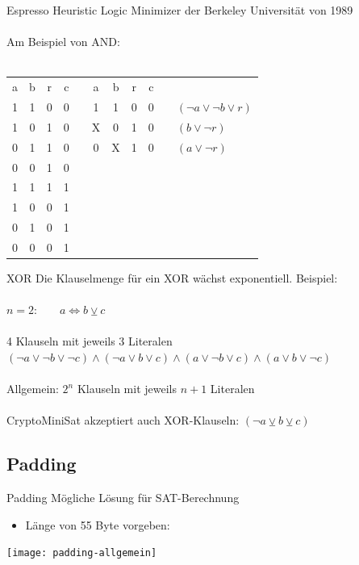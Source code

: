 \documentclass{beamer}
\begin{document}
    \begin{frame}{Espresso}
      Heuristic Logic Minimizer der Berkeley Universität von 1989\\
      ~\\
      Am Beispiel von AND:\\
      ~\\
      \begin{tabular}{ccc|cp{1cm}ccc|cp{1cm}l}
        a & b & r & c & & a & b & r & c\\
        \cline{1-4}\cline{6-9}
        1 & 1 & 0 & 0 & & 1 & 1 & 0 & 0 & & $ (\neg a \vee \neg b \vee r) $\\
        1 & 0 & 1 & 0 & & X & 0 & 1 & 0 & & $ (b \vee \neg r) $\\
        0 & 1 & 1 & 0 & & 0 & X & 1 & 0 & & $ (a \vee \neg r) $\\
        0 & 0 & 1 & 0 \\
        \cline{1-4}
        1 & 1 & 1 & 1 \\
        1 & 0 & 0 & 1 \\
        0 & 1 & 0 & 1 \\
        0 & 0 & 0 & 1 \\
      \end{tabular}
    \end{frame}
    \begin{frame}{XOR}
      Die Klauselmenge für ein XOR wächst exponentiell. Beispiel:\\
      ~\\
      $n = 2$:~~~~$ a \Leftrightarrow b \veebar c$\\
      ~\\
      4 Klauseln mit jeweils 3 Literalen
      ~\\
      $ (\neg a \vee \neg b \vee \neg c) \wedge (\neg a \vee b \vee c) \wedge (a \vee \neg b \vee c) \wedge (a \vee b \vee \neg c) $\\
      ~\\
      Allgemein: $ 2^{n} $ Klauseln mit jeweils $ n + 1 $ Literalen\\
      ~\\
      CryptoMiniSat akzeptiert auch XOR-Klauseln: $ (\neg a \veebar b \veebar c)$\\
    \end{frame}
  \subsection{Padding}
    \begin{frame}{Padding}
      Mögliche Lösung für SAT-Berechnung\\
      \begin{itemize}
       \item Länge von 55 Byte vorgeben:
      \end{itemize}
      \texttt{[image: padding-allgemein]}
    \end{frame}
\end{document}
